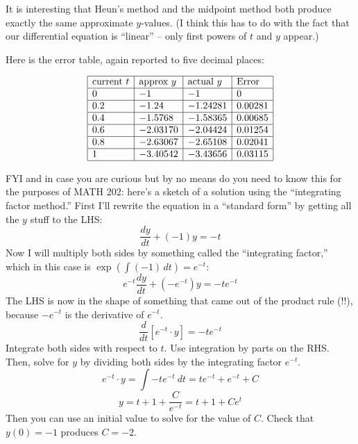 \begin{landscape}
\begin{red}
It is interesting that Heun's method and the midpoint method both produce exactly the same approximate $y$-values. (I think this has to do with the fact that our differential equation is ``linear'' -- only first powers of $t$ and $y$ appear.)

Here is the error table, again reported to five decimal places:

\[
\begin{array}{|l|l|l|l|}
    \hline
    \text{current } t & \text{approx } y & \text{actual } y & \textrm{Error} \\\hline 
    0   & -1       & -1       & 0       \\ \hline
    0.2 & -1.24    & -1.24281 & 0.00281 \\ \hline
    0.4 & -1.5768  & -1.58365 & 0.00685 \\ \hline
    0.6 & -2.03170 & -2.04424 & 0.01254 \\ \hline
    0.8 & -2.63067 & -2.65108 & 0.02041 \\ \hline
    1   & -3.40542 & -3.43656 & 0.03115 \\ \hline
\end{array}
\]

\end{red}

\end{landscape}

\pagebreak

\begin{blue}
FYI and in case you are curious but by no means do you need to know this for the purposes of MATH 202: here's a sketch of a solution using the ``integrating factor method.'' First I'll rewrite the equation in a ``standard form'' by getting all the $y$ stuff to the LHS:
\[\frac{dy}{dt} + (-1) y = -t\]
Now I will multiply both sides by something called the ``integrating factor,'' which in this case is $\exp(\int(-1)\, dt) = e^{-t}$:
\[e^{-t} \frac{dy}{dt} + (-e^{-t}) y = -t e^{-t}\]
The LHS is now in the shape of something that came out of the product rule (!!), because $-e^{-t}$ is the derivative of $e^{-t}$.
\[\frac{d}{dt} \left[ e^{-t} \cdot y \right] = -t e^{-t}\]
Integrate both sides with respect to $t$. Use integration by parts on the RHS. Then, solve for $y$ by dividing both sides by the integrating factor $e^{-t}$.
\[e^{-t}\cdot y = \int -te^{-t}\ dt = t e^{-t} + e^{-t} + C\]
\[y = t + 1 + \frac{C}{e^{-t}} = t + 1 + Ce^t\]
Then you can use an initial value to solve for the value of $C$. Check that $y(0) = -1$ produces $C = -2$.
\end{blue}
